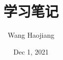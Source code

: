 \documentclass[cn,10pt,math=newtx,color=blue]{elegantbook}
\title{学习笔记}
\author{Wang Haojiang}
\date{Dec 1, 2021}
\begin{document}
	\maketitle
	\frontmatter
	\tableofcontents
	\mainmatter
	
	
	
	
	
	
    
	\nocite{*} 
	\printbibliography
\end{document}
